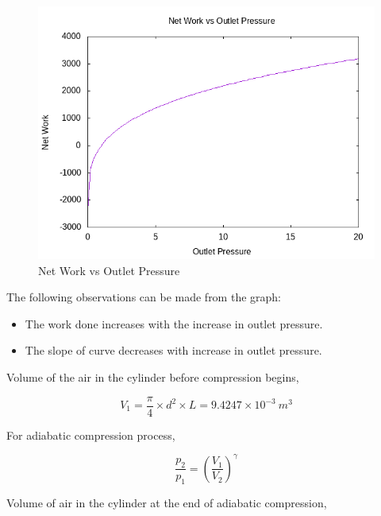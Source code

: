 \documentclass[12pt,a4paper]{article}
\begin{document}
		\begin{figure}[H]
			\centering
			\includegraphics[width=1\textwidth]{images/work-vs-pressure.png}
			\caption{Net Work vs Outlet Pressure}
			\label{fig:net_work_vs_outlet_pressure}
		\end{figure}

		The following observations can be made from the graph:

		\begin{itemize}
			\item The work done increases with the increase in outlet pressure.
			\item The slope of curve decreases with increase in outlet pressure.
		\end{itemize}

		Volume of the air in the cylinder before compression begins,

		\begin{equation*}
			V_1 = \frac{\pi}{4} \times d^2 \times L = 9.4247 \times 10^{-3} \ m^3
		\end{equation*}


		For adiabatic compression process,

		\begin{equation*}
			\frac{p_2}{p_1} = \left(\frac{V_1}{V_2} \right) ^ \gamma
		\end{equation*}

		Volume of air in the cylinder at the end of adiabatic compression,
\end{document}
